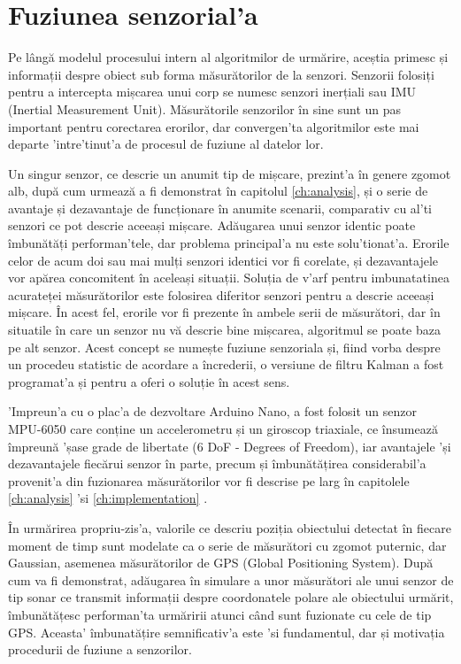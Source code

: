 \documentclass[12pt,a4paper,twoside]{report}
\begin{document}
\section{Fuziunea senzorial'a}

Pe lângă modelul procesului intern al algoritmilor de urmărire, aceștia primesc și informații despre obiect sub forma măsurătorilor de la senzori. Senzorii folosiți pentru a intercepta mișcarea unui corp se numesc senzori inerțiali sau IMU (Inertial Measurement Unit). Măsurătorile senzorilor în sine sunt un pas important pentru corectarea erorilor, dar convergen'ta algoritmilor este mai departe 'intre'tinut'a de procesul de fuziune al datelor lor. 

\vspace{5px}

Un singur senzor, ce descrie un anumit tip de mișcare, prezint'a în genere zgomot alb, după cum urmează a fi demonstrat în capitolul \ref{ch:analysis}, și o serie de avantaje și dezavantaje de funcționare în anumite scenarii, comparativ cu al'ti senzori ce pot descrie aceeași mișcare. Adăugarea unui senzor identic poate îmbunătăți performan'tele, dar problema principal'a nu este solu'tionat'a. Erorile celor de acum doi sau mai mulți senzori identici vor fi corelate, și dezavantajele vor apărea concomitent în aceleași situații. Soluția de v'arf pentru imbunatatinea acurateței măsurătorilor este folosirea diferitor senzori pentru a descrie aceeași mișcare. În acest fel, erorile vor fi prezente în ambele serii de măsurători, dar în situatile în care un senzor nu vă descrie bine mișcarea, algoritmul se poate baza pe alt senzor. Acest concept se numește fuziune senzoriala și, fiind vorba despre un procedeu statistic de acordare a încrederii, o versiune de filtru Kalman a fost programat'a și pentru a oferi o soluție în acest sens.

\vspace{5px}

'Impreun'a cu o plac'a de dezvoltare Arduino Nano, a fost folosit un senzor MPU-6050 care conține un accelerometru și un giroscop triaxiale, ce însumează împreună 'șase grade de libertate (6 DoF - Degrees of Freedom), iar avantajele 'și dezavantajele fiecărui senzor în parte, precum și îmbunătățirea considerabil'a provenit'a din fuzionarea măsurătorilor vor fi descrise pe larg în capitolele \ref{ch:analysis} 'si \ref{ch:implementation} .

\vspace{5px}

În urmărirea propriu-zis'a, valorile ce descriu poziția obiectului detectat în fiecare moment de timp sunt modelate ca o serie de măsurători cu zgomot puternic, dar Gaussian, asemenea măsurătorilor de GPS (Global Positioning System). După cum va fi demonstrat, adăugarea în simulare a unor măsurători ale unui senzor de tip sonar ce transmit informații despre coordonatele polare ale obiectului urmărit, îmbunătățesc performan'ta urmăririi atunci când sunt fuzionate cu cele de tip GPS. Aceasta' îmbunatățire semnificativ'a este 'si fundamentul, dar și motivația procedurii de fuziune a senzorilor.
\end{document}
